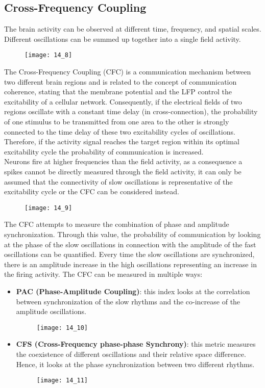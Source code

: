 \subsection{Cross-Frequency Coupling}
The brain activity can be observed at different time, frequency, and spatial scales. Different
oscillations can be summed up together into a single field activity.
\begin{figure}[H]
    \centering
    \texttt{[image: 14\_8]}
\end{figure}
The Cross-Frequency Coupling (CFC) is a communication mechanism between two different brain regions and is
related to the concept of communication coherence, stating that the membrane potential and the LFP
control the excitability of a cellular network. Consequently, if the electrical fields of two regions
oscillate with a constant time delay (in cross-connection), the probability of one stimulus to be
transmitted from one area to the other is strongly connected to the time delay of these two excitability
cycles of oscillations. Therefore, if the activity signal reaches the target region within its optimal
excitability cycle the probability of communication is increased.\\
Neurons fire at higher frequencies than the field activity, as a consequence a spikes cannot be directly
measured through the field activity, it can only be assumed that the connectivity of slow oscillations
is representative of the excitability cycle or the CFC can be considered instead.
\begin{figure}[H]
    \centering
    \texttt{[image: 14\_9]}
\end{figure}
The CFC attempts to measure the combination of phase and amplitude synchronization. Through this value,
the probability of communication by looking at the phase of the slow oscillations in connection with
the amplitude of the fast oscillations can be quantified. Every time the slow oscillations are
synchronized, there is an amplitude increase in the high oscillations representing an increase in the
firing activity. The CFC can be measured in multiple ways:
\begin{itemize}
    \item \textbf{PAC (Phase-Amplitude Coupling)}: this index looks at the correlation between
          synchronization of the slow rhythms and the co-increase of the amplitude oscillations.
          \begin{figure}[H]
              \centering
              \texttt{[image: 14\_10]}
          \end{figure}
    \item \textbf{CFS (Cross-Frequency phase-phase Synchrony)}: this metric measures the coexistence of
          different oscillations and their relative space difference. Hence, it looks at the phase
          synchronization between two different rhythms.
          \begin{figure}[H]
              \centering
              \texttt{[image: 14\_11]}
          \end{figure}
\end{itemize}

